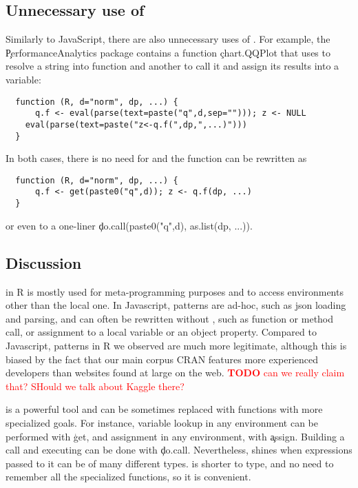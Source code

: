 \documentclass[review,screen,acmsmall,anonymous=true]{acmart}
\newcommand{\authorcomment}[3]{\xspace\textcolor{#1}{{\bf #2} #3}\xspace}
\newcommand{\todo}[1]{\authorcomment{red}{TODO}{#1}}
\begin{document}


\subsection{Unnecessary use of \eval}

Similarly to JavaScript, there are also unnecessary uses of \eval. For example,
the \c{PerformanceAnalytics} package contains a function \c{chart.QQPlot} that
uses \eval to resolve a string into function and another to call it and assign
its results into a variable:
\begin{lstlisting}
  function (R, d="norm", dp, ...) {
	  q.f <- eval(parse(text=paste("q",d,sep=""))); z <- NULL
  	eval(parse(text=paste("z<-q.f(",dp,",...)")))
  }
\end{lstlisting}
  In both cases, there is no need for \eval and the function can be rewritten as
\begin{lstlisting}
  function (R, d="norm", dp, ...) {
	  q.f <- get(paste0("q",d)); z <- q.f(dp, ...)
  }
\end{lstlisting}
or even to a one-liner \c{do.call(paste0("q",d), as.list(dp, ...))}.


\subsection{Discussion}

\Eval in R is mostly used for meta-programming purposes and to access
environments other than the local one. In Javascript, patterns are ad-hoc, such
as json loading and parsing, and can often be rewritten without \eval, such as
function or method call, or assignment to a local variable or an object
property. Compared to Javascript, \eval patterns in R we observed are much more
legitimate, although this is biased by the fact that our main corpus CRAN
features more experienced developers than  websites found at large on the web.
\todo{can we really claim that? SHould we talk about Kaggle there?}

\eval is a powerful tool and can be sometimes replaced with functions with more
specialized goals. For instance, variable lookup in any environment can be
performed with \c{get}, and assignment in any environment, with \c{assign}.
Building a call and executing can be done with \c{do.call}. Nevertheless, \eval
shines when expressions passed to it can be of many different types. %
is shorter to type, and no need to remember all the specialized functions, so
it is convenient.
\end{document}
